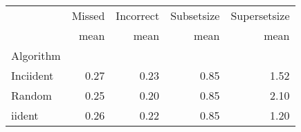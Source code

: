\begin{tabular}{lrrrr}
 & Missed & Incorrect & Subsetsize & Supersetsize \\
 & mean & mean & mean & mean \\
Algorithm &  &  &  &  \\
Inciident & 0.27 & 0.23 & 0.85 & 1.52 \\
Random & 0.25 & 0.20 & 0.85 & 2.10 \\
iident & 0.26 & 0.22 & 0.85 & 1.20 \\
\end{tabular}


